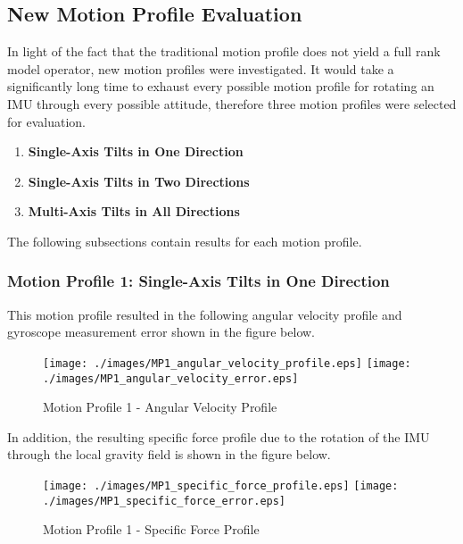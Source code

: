 \subsection{New Motion Profile Evaluation}

In light of the fact that the traditional motion profile does not yield a full rank model operator, new motion profiles were investigated. It would take a significantly long time to exhaust every possible motion profile for rotating an IMU through every possible attitude, therefore three motion profiles were selected for evaluation. 

\begin{enumerate}
	\item \textbf{Single-Axis Tilts in One Direction}
	\item \textbf{Single-Axis Tilts in Two Directions}
	\item \textbf{Multi-Axis Tilts in All Directions}
\end{enumerate}

The following subsections contain results for each motion profile. 


\subsubsection{Motion Profile 1: Single-Axis Tilts in One Direction}

This motion profile resulted in the following angular velocity profile and gyroscope measurement error shown in the figure below. 

\begin{figure}[!h] 
	\centering
	\texttt{[image: ./images/MP1\_angular\_velocity\_profile.eps]} \hfill
	\texttt{[image: ./images/MP1\_angular\_velocity\_error.eps]}
	\caption{Motion Profile 1 - Angular Velocity Profile}
	\label{fig: MP1 angular velocity profile}
\end{figure}
\FloatBarrier

In addition, the resulting specific force profile due to the rotation of the IMU through the local gravity field is shown in the figure below. 

\begin{figure}[!h] 
	\centering
	\texttt{[image: ./images/MP1\_specific\_force\_profile.eps]} \hfill
	\texttt{[image: ./images/MP1\_specific\_force\_error.eps]}
	\caption{Motion Profile 1 - Specific Force Profile}
	\label{fig: MP1 specific force profile}
\end{figure}
\FloatBarrier

